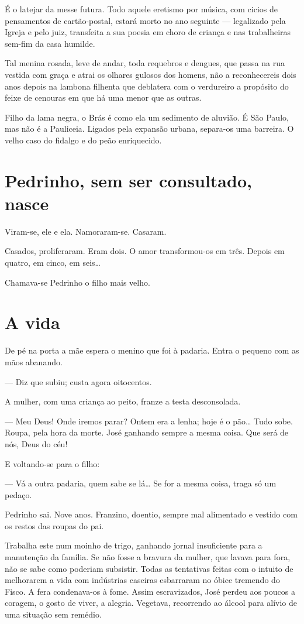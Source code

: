 É o latejar da messe futura. Todo aquele eretismo por música, com cicios
de pensamentos de cartão-postal, estará morto no ano seguinte ---
legalizado pela Igreja e pelo juiz, transfeita a sua poesia em choro de
criança e nas trabalheiras sem-fim da casa humilde.

Tal menina rosada, leve de andar, toda requebros e dengues, que passa na
rua vestida com graça e atrai os olhares gulosos dos homens, não a
reconhecereis dois anos depois na lambona filhenta que deblatera com o
verdureiro a propósito do feixe de cenouras em que há uma menor que as
outras.

Filho da lama negra, o Brás é como ela um sedimento de aluvião. É São
Paulo, mas não é a Pauliceia. Ligados pela expansão urbana, separa-os
uma barreira. O velho caso do fidalgo e do peão enriquecido.

\section{Pedrinho, sem ser consultado, nasce}

Viram-se, ele e ela. Namoraram-se. Casaram.

Casados, proliferaram. Eram dois. O amor transformou-os em três. Depois
em quatro, em cinco, em seis\ldots{}

Chamava-se Pedrinho o filho mais velho.

\section{A vida}

De pé na porta a mãe espera o menino que foi à padaria. Entra o pequeno
com as mãos abanando.

--- Diz que subiu; custa agora oitocentos.

A mulher, com uma criança ao peito, franze a testa desconsolada.

--- Meu Deus! Onde iremos parar? Ontem era a lenha; hoje é o pão\ldots{} Tudo
sobe. Roupa, pela hora da morte. José ganhando sempre a mesma coisa. Que
será de nós, Deus do céu!

E voltando-se para o filho:

--- Vá a outra padaria, quem sabe se lá\ldots{} Se for a mesma coisa, traga
só um pedaço.

Pedrinho sai. Nove anos. Franzino, doentio, sempre mal alimentado e
vestido com os restos das roupas do pai.

Trabalha este num moinho de trigo, ganhando jornal insuficiente para a
manutenção da família. Se não fosse a bravura da mulher, que lavava para
fora, não se sabe como poderiam subsistir. Todas as tentativas feitas
com o intuito de melhorarem a vida com indústrias caseiras esbarraram no
óbice tremendo do Fisco. A fera condenava-os à fome. Assim escravizados,
José perdeu aos poucos a coragem, o gosto de viver, a alegria. Vegetava,
recorrendo ao álcool para alívio de uma situação sem remédio.

